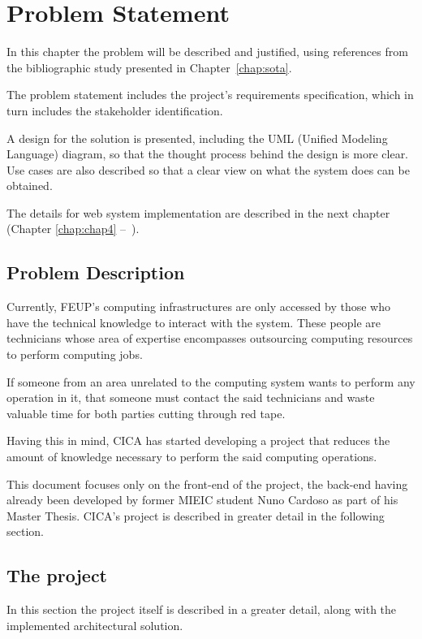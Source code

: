 \chapter{Problem Statement} \label{chap:chap3}

In this chapter the problem will be described and justified, using references from the bibliographic study presented in Chapter~\ref{chap:sota}.

The problem statement includes the project's requirements specification, which in turn includes the stakeholder identification. 

A design for the solution is presented, including the UML (Unified Modeling Language) diagram, so that the thought process behind the design is more clear. Use cases are also described so that a clear view on what the system does can be obtained. 

The details for web system implementation are described in the next chapter (Chapter \ref{chap:chap4} --~).

\section{Problem Description}

Currently, FEUP's computing infrastructures are only accessed by those who have the technical knowledge to interact with the system. These people are technicians whose area of expertise encompasses outsourcing computing resources to perform computing jobs. 

If someone from an area unrelated to the computing system wants to perform any operation in it, that someone must contact the said technicians and waste valuable time for both parties cutting through red tape.

Having this in mind, CICA has started developing a project that reduces the amount of knowledge necessary to perform the said computing operations.

This document focuses only on the front-end of the project, the back-end having already been developed by former MIEIC student Nuno Cardoso as part of his Master Thesis. CICA's project is described in greater detail in the following section.

\section{The project} \label{sec:project}

In this section the project itself is described in a greater detail, along with the implemented architectural solution.

